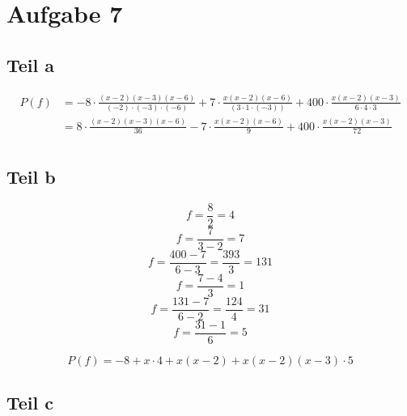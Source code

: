 \documentclass[10pt,a4paper]{article}
\begin{document}
\section{Aufgabe 7}

\subsection{Teil a}

\begin{align*}
  P(f) & = -8 \cdot \frac{(x - 2)(x - 3)(x - 6)}{(-2) \cdot (-3) \cdot (-6)} + 7 \cdot \frac{x(x - 2)(x - 6)}{(3 \cdot 1 \cdot (-3))} + 400 \cdot \frac{x(x - 2)(x - 3)}{6 \cdot 4 \cdot 3}\\
  & = 8 \cdot \frac{(x - 2)(x - 3)(x - 6)}{36} - 7 \cdot \frac{x(x - 2)(x - 6)}{9} + 400 \cdot \frac{x(x - 2)(x - 3)}{72}\\
\end{align*}

\subsection{Teil b}

\begin{equation}
  [x_{0}, x_{1}]f = \frac{8}{2} = 4
\end{equation}
\begin{equation}
  [x_{1}, x_{2}]f = \frac{7}{3 - 2} = 7
\end{equation}
\begin{equation}
  [x_{2}, x_{3}]f = \frac{400 - 7}{6 - 3} = \frac{393}{3} = 131
\end{equation}
\begin{equation}
  [x_{0}, x_{1}, x_{2}]f = \frac{7 - 4}{3} = 1
\end{equation}
\begin{equation}
  [x_{1}, x_{2}, x_{3}]f = \frac{131 - 7}{6 - 2} = \frac{124}{4} = 31
\end{equation}
\begin{equation}
  [x_{0}, x_{1}, x_{2}, x_{3}]f = \frac{31 - 1}{6} = 5
\end{equation}

\begin{equation}
  P(f) = -8 + x \cdot 4 + x(x - 2) + x(x - 2)(x - 3) \cdot 5
\end{equation}

\subsection{Teil c}
\end{document}
